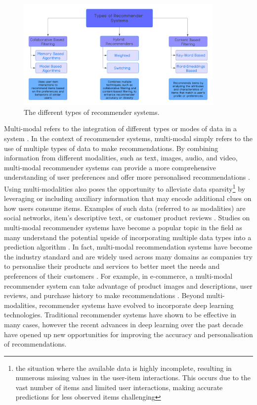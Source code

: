 \begin{figure}[h]
    \centering
    \includegraphics[width=0.9\textwidth]{Figures/Untitled.png} %
    \caption{The different types of recommender systems.}
    \label{fig:types_recommenders}
  \end{figure}
  
Multi-modal refers to the integration of different types or modes of data in a system \cite{truong2021multi}. In the context of recommender systems, multi-modal simply refers to the use of multiple types of data to make recommendations. By combining information from different modalities, such as text, images, audio, and video, multi-modal recommender systems can provide a more comprehensive understanding of user preferences and offer more personalised recommendations \cite{truong2021multi}. Using multi-modalities also poses the opportunity to alleviate data sparsity\footnote{the situation where the available data is highly incomplete, resulting in numerous missing values in the user-item interactions. This occurs due to the vast number of items and limited user interactions, making accurate predictions for less observed items challenging} by leveraging or including auxiliary information that may encode additional clues on how users consume items. Examples of such data (referred to as modalities) are social networks, item’s descriptive text, or customer product reviews \cite{truong2021multi}. Studies on multi-modal recommender systems have become a popular topic in the field as many understand the potential upside of incorporating multiple data types into a prediction algorithm \cite{truong2021multi}. In fact, multi-modal recommendation systems have become the industry standard and are widely used across many domains as companies try to personalise their products and services to better meet the needs and preferences of their customers \cite{liu2023multimodal}. For example, in e-commerce, a multi-modal recommender system can take advantage of product images and descriptions, user reviews, and purchase history to make recommendations \cite{liu2023multimodal}. Beyond multi-modalities, recommender systems have evolved to incorporate deep learning technologies. Traditional recommender systems have shown to be effective in many cases, however the recent advances in deep learning over the past decade have opened up new opportunities for improving the accuracy and personalisation of recommendations. 


